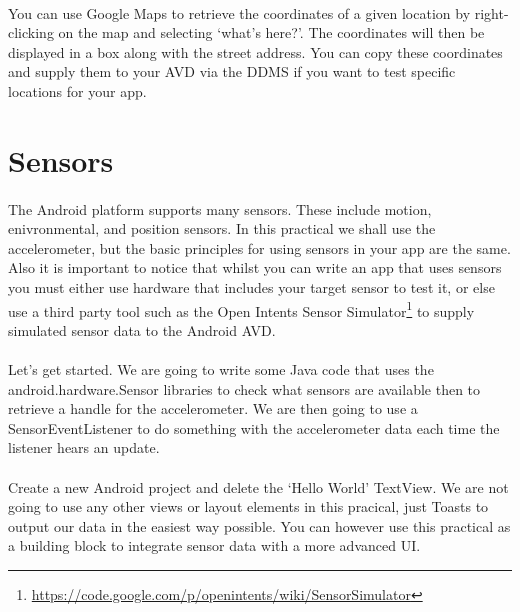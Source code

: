 \paragraph{} You can use Google Maps to retrieve the coordinates of a given location by right-clicking on the map and selecting `what's here?'. The coordinates will then be displayed in a box along with the street address. You can copy these coordinates and supply them to your AVD via the DDMS if you want to test specific locations for your app.


\section{Sensors}
\paragraph{} The Android platform supports many sensors. These include motion, enivronmental, and position sensors. In this practical we shall use the accelerometer, but the basic principles for using sensors in your app are the same. Also it is important to notice that whilst you can write an app that uses sensors you must either use hardware that includes your target sensor to test it, or else use a third party tool such as the Open Intents Sensor Simulator\footnote{\url{https://code.google.com/p/openintents/wiki/SensorSimulator}} to supply simulated sensor data to the Android AVD.

\paragraph{} Let's get started. We are going to write some Java code that uses the android.hardware.Sensor libraries to check what sensors are available then to retrieve a handle for the accelerometer. We are then going to use a SensorEventListener to do something with the accelerometer data each time the listener hears an update.

\paragraph{} Create a new Android project and delete the `Hello World' TextView. We are not going to use any other views or layout elements in this pracical, just Toasts to output our data in the easiest way possible. You can however use this practical as a building block to integrate sensor data with a more advanced UI.

